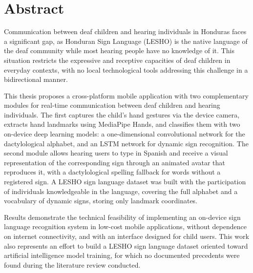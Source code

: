 \MediaOptionLogicBlank

\chapter*{Abstract}

Communication between deaf children and hearing individuals in Honduras faces a significant gap, as Honduran Sign Language (LESHO) is the native language of the deaf community while most hearing people have no knowledge of it. This situation restricts the expressive and receptive capacities of deaf children in everyday contexts, with no local technological tools addressing this challenge in a bidirectional manner.

This thesis proposes a cross-platform mobile application with two complementary modules for real-time communication between deaf children and hearing individuals. The first captures the child's hand gestures via the device camera, extracts hand landmarks using MediaPipe Hands, and classifies them with two on-device deep learning models: a one-dimensional convolutional network for the dactylological alphabet, and an LSTM network for dynamic sign recognition. The second module allows hearing users to type in Spanish and receive a visual representation of the corresponding sign through an animated avatar that reproduces it, with a dactylological spelling fallback for words without a registered sign. A LESHO sign language dataset was built with the participation of individuals knowledgeable in the language, covering the full alphabet and a vocabulary of dynamic signs, storing only landmark coordinates.

Results demonstrate the technical feasibility of implementing an on-device sign language recognition system in low-cost mobile applications, without dependence on internet connectivity, and with an interface designed for child users. This work also represents an effort to build a LESHO sign language dataset oriented toward artificial intelligence model training, for which no documented precedents were found during the literature review conducted.


\MediaOptionLogicBlank